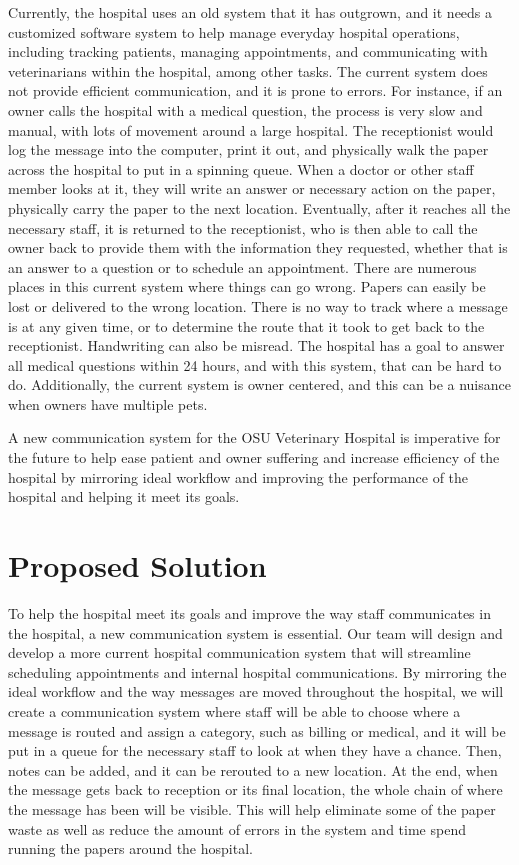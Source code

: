 \documentclass[letterpaper,10pt,draftclsnofoot,onecolumn]{article}
\begin{document}
Currently, the hospital uses an old system that it has outgrown, and it needs a customized software system to help manage everyday hospital operations, including tracking patients, managing appointments, and communicating with veterinarians within the hospital, among other tasks. The current system does not provide efficient communication, and it is prone to errors. For instance, if an owner calls the hospital with a medical question, the process is very slow and manual, with lots of movement around a large hospital. The receptionist would log the message into the computer, print it out, and physically walk the paper across the hospital to put in a spinning queue. When a doctor or other staff member looks at it, they will write an answer or necessary action on the paper, physically carry the paper to the next location. Eventually, after it reaches all the necessary staff, it is returned to the receptionist, who is then able to call the owner back to provide them with the information they requested, whether that is an answer to a question or to schedule an appointment. There are numerous places in this current system where things can go wrong. Papers can easily be lost or delivered to the wrong location. There is no way to track where a message is at any given time, or to determine the route that it took to get back to the receptionist. Handwriting can also be misread. The hospital has a goal to answer all medical questions within 24 hours, and with this system, that can be hard to do. Additionally, the current system is owner centered, and this can be a nuisance when owners have multiple pets. 

A new communication system for the OSU Veterinary Hospital is imperative for the future to help ease patient and owner suffering and increase efficiency of the hospital by mirroring ideal workflow and improving the performance of the hospital and helping it meet its goals. 



\section{Proposed Solution}

To help the hospital meet its goals and improve the way staff communicates in the hospital, a new communication system is essential. Our team will design and develop a more current hospital communication system that will streamline scheduling appointments and internal hospital communications. By mirroring the ideal workflow and the way messages are moved throughout the hospital, we will create a communication system where staff will be able to choose where a message is routed and assign a category, such as billing or medical, and it will be put in a queue for the necessary staff to look at when they have a chance. Then, notes can be added, and it can be rerouted to a new location. At the end, when the message gets back to reception or its final location, the whole chain of where the message has been will be visible. This will help eliminate some of the paper waste as well as reduce the amount of errors in the system and time spend running the papers around the hospital. 
\end{document}
